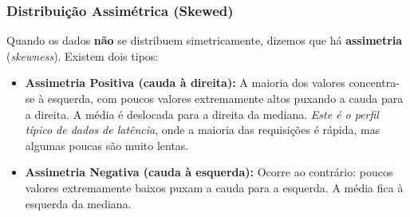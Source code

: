 \documentclass[12pt,a4paper]{report}
\begin{document}
\subsubsection{Distribuição Assimétrica (Skewed)}

Quando os dados \textbf{não} se distribuem simetricamente, dizemos que há \textbf{assimetria} (\textit{skewness}). Existem dois tipos:

\begin{itemize}[nosep]
    \item \textbf{Assimetria Positiva (cauda à direita):} A maioria dos valores concentra-se à esquerda, com poucos valores extremamente altos puxando a cauda para a direita. A média é deslocada para a direita da mediana. \emph{Este é o perfil típico de dados de latência}, onde a maioria das requisições é rápida, mas algumas poucas são muito lentas.
    \item \textbf{Assimetria Negativa (cauda à esquerda):} Ocorre ao contrário: poucos valores extremamente baixos puxam a cauda para a esquerda. A média fica à esquerda da mediana.
\end{itemize}
\end{document}
